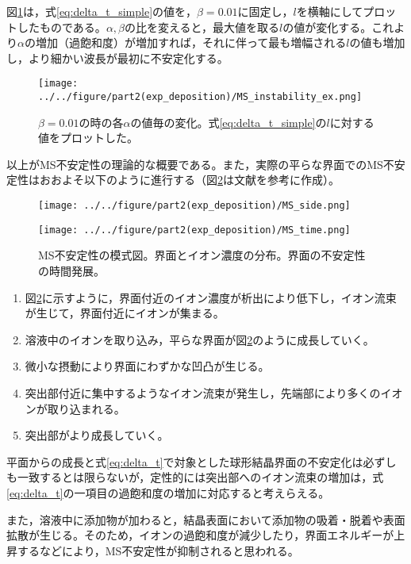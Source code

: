 \documentclass[autodetect-engine,dvi=dvipdfmx,a4paper,ja=standard,oneside,openany,11pt,draft]{bxjsbook}
\begin{document}
図\ref{fig:MS_instability_ex}は，式\eqref{eq:delta_t_simple}の値を，$\beta=0.01$に固定し，$l$を横軸にしてプロットしたものである。$\alpha,\beta$の比を変えると，最大値を取る$l$の値が変化する。これより$\alpha$の増加（過飽和度）が増加すれば，それに伴って最も増幅される$l$の値も増加し，より細かい波長が最初に不安定化する。

\begin{figure}[htbp]
  \centering
  \texttt{[image: ../../figure/part2(exp\_deposition)/MS\_instability\_ex.png]}
  \caption{$\beta=0.01$の時の各$\alpha$の値毎の変化。式\eqref{eq:delta_t_simple}の$l$に対する値をプロットした。}
  \label{fig:MS_instability_ex}
\end{figure}

以上がMS不安定性の理論的な概要である。また，実際の平らな界面でのMS不安定性はおおよそ以下のように進行する（図\ref{fig:MS}は文献\cite{結晶成長}を参考に作成）。

\begin{figure}[htbp]
  \begin{minipage}
    {0.5\textwidth}
    \subcaption{}
    \centering
    \texttt{[image: ../../figure/part2(exp\_deposition)/MS\_side.png]}
    \label{fig:MS_side}
  \end{minipage}
  \begin{minipage}
    {0.5\textwidth}
    \subcaption{}
    \centering
    \texttt{[image: ../../figure/part2(exp\_deposition)/MS\_time.png]}
    \label{fig:MS_top}
  \end{minipage}
  \caption{MS不安定性の模式図。界面とイオン濃度の分布。界面の不安定性の時間発展。}
  \label{fig:MS}
\end{figure}

\begin{enumerate}
  \item 図\ref{fig:MS}に示すように，界面付近のイオン濃度が析出により低下し，イオン流束が生じて，界面付近にイオンが集まる。
  \item 溶液中のイオンを取り込み，平らな界面が図\ref{fig:MS}のように成長していく。
  \item 微小な摂動により界面にわずかな凹凸が生じる。
  \item 突出部付近に集中するようなイオン流束が発生し，先端部により多くのイオンが取り込まれる。
  \item 突出部がより成長していく。
\end{enumerate}
平面からの成長と式\eqref{eq:delta_t}で対象とした球形結晶界面の不安定化は必ずしも一致するとは限らないが，定性的には突出部へのイオン流束の増加は，式\eqref{eq:delta_t}の一項目の過飽和度の増加に対応すると考えらえる。

また，溶液中に添加物が加わると，結晶表面において添加物の吸着・脱着や表面拡散が生じる。そのため，イオンの過飽和度が減少したり，界面エネルギーが上昇するなどにより，MS不安定性が抑制されると思われる。

\ifdraft{
  
  
}{}
\end{document}
